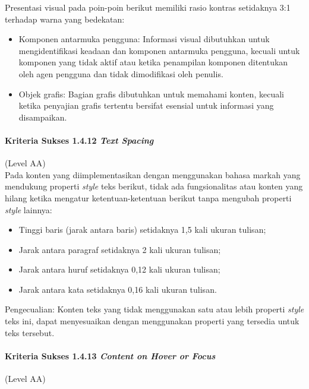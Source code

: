 Presentasi visual pada poin-poin berikut memiliki rasio kontras setidaknya 3:1 terhadap warna yang bedekatan:

\begin{itemize}
	\item Komponen antarmuka pengguna: Informasi visual dibutuhkan untuk mengidentifikasi keadaan dan komponen antarmuka pengguna, kecuali untuk komponen yang tidak aktif atau ketika penampilan komponen ditentukan oleh agen pengguna dan tidak dimodifikasi oleh penulis.
	\item Objek grafis: Bagian grafis dibutuhkan untuk memahami konten, kecuali ketika penyajian grafis tertentu bersifat esensial untuk informasi yang disampaikan.
\end{itemize}

\paragraph{Kriteria Sukses 1.4.12 \textit{Text Spacing}}
\label{sec:kriteria_sukses_1.4.12}
(Level AA)\\

Pada konten yang diimplementasikan dengan menggunakan bahasa markah yang mendukung properti \textit{style} teks berikut, tidak ada fungsionalitas atau konten yang hilang ketika mengatur ketentuan-ketentuan berikut tanpa mengubah properti \textit{style} lainnya:

\begin{itemize}
	\item Tinggi baris (jarak antara baris) setidaknya 1,5 kali ukuran tulisan;
	\item Jarak antara paragraf setidaknya 2 kali ukuran tulisan;
	\item Jarak antara huruf setidaknya 0,12 kali ukuran tulisan;
	\item Jarak antara kata setidaknya 0,16 kali ukuran tulisan.
\end{itemize}

Pengecualian: Konten teks yang tidak menggunakan satu atau lebih properti \textit{style} teks ini, dapat menyesuaikan dengan menggunakan properti yang tersedia untuk teks tersebut.

\paragraph{Kriteria Sukses 1.4.13 \textit{Content on Hover or Focus}}
\label{sec:kriteria_sukses_1.4.13}
(Level AA)\\

